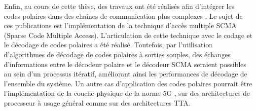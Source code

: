Enfin, au cours de cette thèse, des travaux ont été réalisés afin d'intégrer les codes polaires dans des chaînes de communication plus complexes . Le sujet de ces publications est l'implémentation de la technique d'accès multiple SCMA (Sparse Code Multiple Access). L'articulation de cette technique avec le codage et le décodage de codes polaires a été réalisé. Toutefois, par l'utilisation d'algorithmes de décodage de codes polaires à sorties souples, des échanges d'informations entre le décodeur polaire et le décodeur SCMA seraient possibles au sein d'un processus itératif, améliorant ainsi les performances de décodage de l'ensemble du système. Un autre cas d'application des codes polaires pourrait être l'implémentation de la couche physique de la norme 5G \cite{3gpp_ts_2017}, sur des architectures de processeur à usage général comme sur des architectures TTA.
